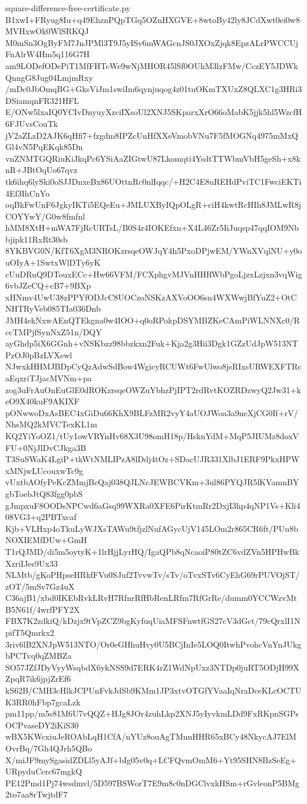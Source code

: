 \documentclass[11pt]{article}
\theoremstyle{definition}
\theoremstyle{remark}
\begin{document}
\begin{filecontents*}[overwrite]{square-difference-free-certificate.py}
B1xwI+FRyug8Iu+q49EhznPQpTGq5OZnHXGVE+8wtoBy42ly8JCdXwt0ei0w8MVHxwOk0WlSRKQJ
M0mSn3OgByFM7JnJPMl3T9J5yISv6mWAGcnJS0JXOxZjqk8EpzALrPWCCUjFnAlrW4Hm5q116G7H
am9LODefODePiT1MfFHTcWe9wNjMHOR45lSf0OUhM3lzFMw/CczEY5JDWkQnngG8Jug04LmjmRxy
/mDc0JbOmqBG+GksViJm1swiIm6qynjuqog4z01tuOKmTXUxZ8QLXC1g3HRi3DSiamqnFR321HFL
E/ONw5lxaIQ0YCIvDnyuyXzciIXsoUl2XNJ5SKparxXrO66oMabK5jjk5hl5WzcfH6FJUvsCouTk
jV2aZLzD2AJK6qHfi7+fzgdm8IPZcUnHfXXeVmobVNu7F5fMOGNq4975mMxQGl4vN5PqEKqk85Dn
vnZNMTGQRiuKiJkqPc6YSiAaZIGtwU87Lkomqti4YsdtTTWbmVbH5geSh+x8knR+JBtOqUo67qvz
tk6ihq6lySki0oSJJDnxeBx86UOttnRc0nlIqqc/+H2C4E8uREHdPviTC1FwciEKTi4Ef3IhCnYo
oqBkFwUnF6JgkyIKTi5EQeEu+JMLUXByIQpOLgR+ciH4kwtRcHIh8JMLwR8jCOYYwY/G0w8fmfnl
hMM8XtH+mWA7FjRcURTsL/B0S4r4IOKEfxn+X4L46Zr5IiJuqsp47qqIOM9Nbbjipk11RxRt30sb
8YKBVG0N/KfT6XgM3NROKzrsqeOWJqY4h5PxoDPjwEM/YWnXVqlNU+y0ouOIyA+1SwtxWlDTy6yK
cUuDRuQ9DTouxECc+Hw66VFM/FCXphgvMJVnHHRWbPgoLjzxLzjxn3vqWig6vbJZeCQ+cB7+9BXp
xHNmv4UwU38zPPYfODJcC8UOCzoNSKzAXVoOO6sn4WXWwjBfYuZ2+OtCNHTRyVeb085TIa036Dnb
JMH4ekNxwAEnQTEkgna0w4IOO+q0oRPokpDSYMBZKeCAmPiWLNNXc0/RccTMPjfSynNxZ51n/DQY
ayGhdp5iX6GGnh+vNSKbzz98bbzkxn2Fuk+Kja2g3Hii3Dgk1GZzUdJpW513NTPzOJ0pBzLVXewl
NJwxkHHMJBDpCyQzAdwSdBow4WgicyRCUWt6FwUlwo8jsRIxsURWEXFTRcaEqxriTJjacMVNm+pa
zog3uFrAuOnEuGlE0dROKzrsqeOWZuYbhzPjIPT2rdRvtKOZRDzwyQ2Jw31+keO9X40kuF9AKIXF
pONwwoDxAsBEC4xGiDu66KhX9BLFzMR2vyY4aUOJWoa3a9neXjCG0If+rV/NhsMQ2kMVCTexKL1m
KQ2YiYoOZ1/tUy1owVRYnHv68X3U98omH18p/HsknYdM+MqP5JIUMz8doxVFU+0NjJlDvCJkga3B
T3SuSWaK4LgiP+tkWtNMLIPzA8lDdj4tOz+SDacUJR331XlbJ1ERF9PkxHPWxMNjwLUcouxwTc9g
vUxtbAOfyPeKcZMmjBcQaj038QJLNcJEWBCVKm+3ul86PYQJR5lKVamnBYgbToebJtQ83fgg0pbS
gJmpxuF8OODsNPCwd6aGsq99WXRa0XFE6PirKtmRr2DxjI3hp4qNP1Vs+Kli408VG3+q2PBTxcaf
Kjb+VLHxp4oTkuLyWJXsTAWu9tfjzlNufAGycUjV145LOm2r865CR6ft/PUu8bNOXIEMfDUw+GmH
T1rQJMD/di5m5oytyK+1lrHjjLyrHQ/IgaQPb8qNcaoiP80tZC6vdZVn5HPHwBkXzriIJes9Ux33
NLMtb/gKoPHpseHRkfFVu0SJuf2TvvwTv/sTv/oTvxSTv6CyEhG69rPUVOjST/zOT/5mSv7Gz4uX
C36ajB1/xbd0IKEbRvkLRvH7RfnrRfHbRenLRfm7RfGrRe/dumm0YCCWzvMtB5N61f/4wrfPFY2X
FBX7K2zdkiQ/kDzjx9tVpZCZ9bgKyfuqUiaMFSFnwtfGS27cV3dGct/79cQrxlI1NpifT5Qmrkx2
3riv6lB2XNJpW513NTO/Or0eGHhuHvy0U5BCjInIe5LOQ0ItwhPvohcVnYnJUkgbPCTvq0qZMBZa
SO57JZfJDyVyyWsqbdX6ykNSS9d7ERK4rZ1WdNpUxz3NTDp0juRT5ODjH99XZpqR7ik6jpjZrEf6
kS62B/CMH3cHlkJCPUnFvkJdSb9KMm1JP3xtvOTGfYVaaIqNraDceKLcOCTUK3RR0hFbp7gcaLzk
pm11pp/m5s81M6U7vQQZ+HJg8JOr4zuhLkp2XNJ5yIyvkmLDd9FxRKpnSGPsOCPvaseDY2iKiS30
wBX5KWcxiuJeROAbLqH1CfA/nYUz8ouAgTMunHHR65xBCy48NkycAJ7ElMOvrBq/7Gh4QJrh5QBo
X/miJF9mySgasidZDLl5yAJf+bIg05v0q+LCFQvmOmM6+Yt95SHN8BzSeEg+URpyduCerc67mgkQ
PE12Pmd1Pj74wsdmvl/5D597BSWorT7E9m8c0nDGClvxkHSm+rGvleonP5BMg2to7aa8rTwjtdF7

\end{filecontents*}
\end{document}
